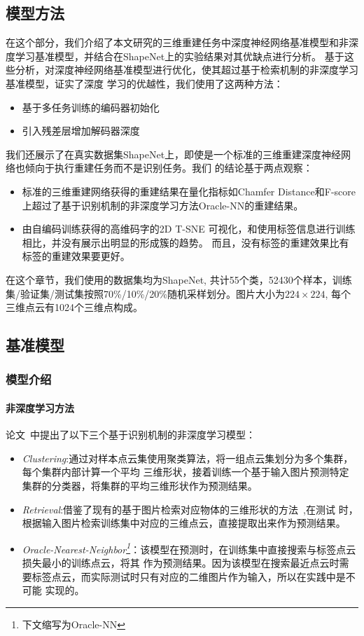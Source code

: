 \documentclass[bachelor, nocolorlinks, printoneside]{seuthesis} %
\begin{document}
\begin{Main}
\chapter{模型方法}
在这个部分，我们介绍了本文研究的三维重建任务中深度神经网络基准模型和非深度学习基准模型，并结合在ShapeNet上的实验结果对其优缺点进行分析。
基于这些分析，对深度神经网络基准模型进行优化，使其超过基于检索机制的非深度学习基准模型，证实了深度
学习的优越性，我们使用了这两种方法：
\begin{itemize}[\hspace{1cm}]
    \item[1.] 基于多任务训练的编码器初始化
    \item[2.] 引入残差层增加解码器深度
\end{itemize}
我们还展示了在真实数据集ShapeNet上，即使是一个标准的三维重建深度神经网络也倾向于执行重建任务而不是识别任务。我们
的结论基于两点观察：
\begin{itemize}[\hspace{1cm}]
    \item[1.] 标准的三维重建网络获得的重建结果在量化指标如Chamfer Distance和F-score上超过了基于识别机制的非深度学习方法Oracle-NN的重建结果。
    \item[2.] 由自编码训练获得的高维码字的2D T-SNE 可视化，和使用标签信息进行训练相比，并没有展示出明显的形成簇的趋势。
    而且，没有标签的重建效果比有标签的重建效果要更好。
\end{itemize}

在这个章节，我们使用的数据集均为ShapeNet, 共计55个类，52430个样本，训练集/验证集/测试集按照70\%/10\%/20\%随机采样划分。图片大小为$224 \times 224 $,
每个三维点云有1024个三维点构成。


\section{基准模型}
\subsection{模型介绍}
\subsubsection{非深度学习方法}

论文~\cite{tatarchenko2019single}中提出了以下三个基于识别机制的非深度学习模型：
\begin{itemize}
    \item \textit{Clustering}:通过对样本点云集使用聚类算法，将一组点云集划分为多个集群，每个集群内部计算一个平均
    三维形状，接着训练一个基于输入图片预测特定集群的分类器，将集群的平均三维形状作为预测结果。
    \item \textit{Retrieval}:借鉴了现有的基于图片检索对应物体的三维形状的方法~\cite{10.1145/2816795.2818071},在测试
    时，根据输入图片检索训练集中对应的三维点云，直接提取出来作为预测结果。
    \item \textit{Oracle-Nearest-Neighbor\footnote[1]{下文缩写为Oracle-NN}}：该模型在预测时，在训练集中直接搜索与标签点云损失最小的训练点云，将其
    作为预测结果。因为该模型在搜索最近点云时需要标签点云，而实际测试时只有对应的二维图片作为输入，所以在实践中是不可能
    实现的。
\end{itemize}


\end{Main}
\end{document}
